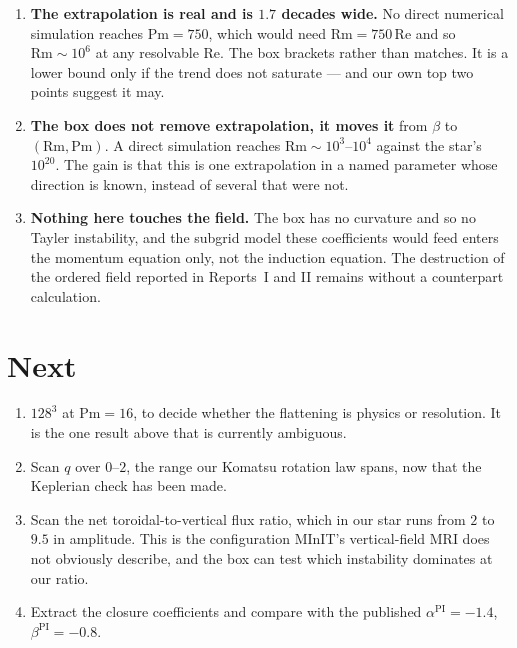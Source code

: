 \documentclass[11pt,a4paper]{article}
\newcommand{\Pm}{\mathrm{Pm}}
\newcommand{\Rm}{\mathrm{Rm}}
\newcommand{\Rey}{\mathrm{Re}}
\begin{document}
\begin{enumerate}\itemsep2pt
\item \textbf{The extrapolation is real and is $1.7$ decades wide.} No direct
      numerical simulation reaches $\Pm = 750$, which would need
      $\Rm = 750\,\Rey$ and so $\Rm \sim 10^6$ at any resolvable $\Rey$. The box
      brackets rather than matches. It is a lower bound only if the trend does
      not saturate --- and our own top two points suggest it may.
\item \textbf{The box does not remove extrapolation, it moves it} from $\beta$
      to $(\Rm, \Pm)$. A direct simulation reaches $\Rm \sim 10^3$--$10^4$
      against the star's $10^{20}$. The gain is that this is one extrapolation
      in a named parameter whose direction is known, instead of several that
      were not.
\item \textbf{Nothing here touches the field.} The box has no curvature and so
      no Tayler instability, and the subgrid model these coefficients would feed
      enters the momentum equation only, not the induction equation. The
      destruction of the ordered field reported in Reports~I and II remains
      without a counterpart calculation.
\end{enumerate}

\section*{Next}

\begin{enumerate}\itemsep2pt
\item $128^3$ at $\Pm = 16$, to decide whether the flattening is physics or
      resolution. It is the one result above that is currently ambiguous.
\item Scan $q$ over $0$--$2$, the range our Komatsu rotation law spans, now that
      the Keplerian check has been made.
\item Scan the net toroidal-to-vertical flux ratio, which in our star runs from
      $2$ to $9.5$ in amplitude. This is the configuration MInIT's
      vertical-field MRI does not obviously describe, and the box can test which
      instability dominates at our ratio.
\item Extract the closure coefficients and compare with the published
      $\alpha^{\mathrm{PI}} = -1.4$, $\beta^{\mathrm{PI}} = -0.8$.
\end{enumerate}
\end{document}
